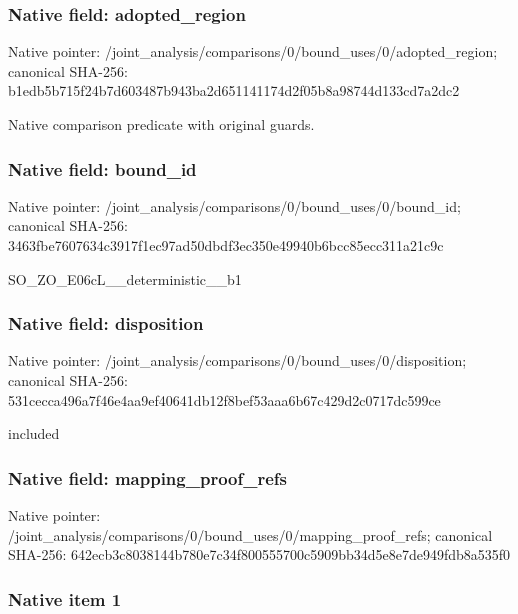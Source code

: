 \documentclass[10pt,a4paper]{article}
\begin{document}
\subsubsection{Native field: adopted\_region}


Native pointer: /joint\_analysis/comparis\allowbreak{}ons/0/bound\_uses/0/adopt\allowbreak{}ed\_region; canonical SHA-256: b1edb5b715f24b7d603487b9\allowbreak{}43ba2d651141174d2f05b8a9\allowbreak{}8744d133cd7a2dc2


Native comparison predicate with original guards.


\subsubsection{Native field: bound\_id}


Native pointer: /joint\_analysis/comparis\allowbreak{}ons/0/bound\_uses/0/bound\allowbreak{}\_id; canonical SHA-256: 3463fbe7607634c3917f1ec9\allowbreak{}7ad50dbdf3ec350e49940b6b\allowbreak{}cc85ecc311a21c9c


SO\_ZO\_E06cL\_\_deterministic\_\_b1


\subsubsection{Native field: disposition}


Native pointer: /joint\_analysis/comparis\allowbreak{}ons/0/bound\_uses/0/dispo\allowbreak{}sition; canonical SHA-256: 531cecca496a7f46e4aa9ef4\allowbreak{}0641db12f8bef53aaa6b67c4\allowbreak{}29d2c0717dc599ce


included


\subsubsection{Native field: mapping\_proof\_refs}


Native pointer: /joint\_analysis/comparis\allowbreak{}ons/0/bound\_uses/0/mappi\allowbreak{}ng\_proof\_refs; canonical SHA-256: 642ecb3c8038144b780e7c34\allowbreak{}f800555700c5909bb34d5e8e\allowbreak{}7de949fdb8a535f0



\subsubsection{Native item 1}
\end{document}

